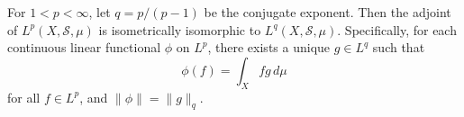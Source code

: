 For $1 < p < \infty$, let $q = p/(p-1)$ be the conjugate exponent. Then the adjoint of $L^p(X, \mathcal{S}, \mu)$ is isometrically isomorphic to $L^q(X, \mathcal{S}, \mu)$. Specifically, for each continuous linear functional $\phi$ on $L^p$, there exists a unique $g \in L^q$ such that
$$\phi(f) = \int_X f g \, d\mu$$
for all $f \in L^p$, and $\|\phi\| = \|g\|_q$.
